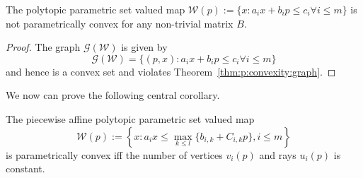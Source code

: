 %
\begin{korr}\label{thm:polytopic:set:not:p:convex}
The polytopic parametric set valued map $\mathcal W(p):=\{x: a_i x + b_i p\leq c_i \forall i\leq m\}$ is not parametrically convex for 
any non-trivial matrix $B$.
\end{korr}
%
\begin{proof}
The graph $\mathscr G(\mathcal W)$ is given by
%
\begin{equation*}
	\mathscr G(\mathcal W) = \{(p,x):a_i x + b_i p\leq c_i \forall i\leq m\}
\end{equation*}
%
and hence is a convex set and violates Theorem~\ref{thm:p:convexity:graph}.
\end{proof}
%
We now can prove the following central corollary.
%
\begin{korr}\label{thm:p:convexity:PWA:set:constant:num:verts}
The piecewise affine polytopic parametric set valued map 
%
\begin{equation}\label{eq:definition:PWA:polytopic:set:general}
	\mathcal W(p) := \left\{x: a_i x \leq \max_{k\leq l}\{b_{i,k} + C_{i,k}p\},i\leq m\right\}
\end{equation}
%
is parametrically convex iff the number of vertices $v_i(p)$ and rays $u_i(p)$ is constant.
\end{korr}
%
